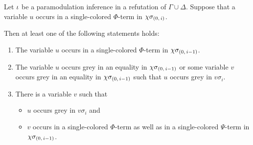 \documentclass[,%
	draft=false,%
	numbers=noendperiod
	12pt,
	a4paper,
	oneside,%
	openany,
]{memoir}
\newcommand{\inv}{\ensuremath{\chi}}
\begin{document}
\begin{lemma}
	\label{lemma:var_in_sc_term_paramod}
	Let $\iota$ be a paramodulation inference in a refutation of $\Gamma\cup\Delta$.
	Suppose that a variable $u$ occurs in a single-colored $\Phi$-term in $\inv\sigmazi$.

	Then at least one of the following statements holds:
	\begin{enumerate}

		\item
			\label{17_5}
			The variable $u$ occurs in a single-colored $\Phi$-term in $\inv\sigmazmi$.

		\item
			\label{17_6}
			The variable $u$ occurs grey in an equality in $\inv\sigmazmi$
			or 
			some variable $v$ occurs grey in an equality in $\inv\sigmazmi$ such that $u$ occurs grey in $v\sigma_i$.






		\item
			\label{17_2}
			There is a variable $v$ such that 
			{
				\renewcommand{\labelitemi}{\textendash}
				\begin{itemize}
					\item $u$ occurs grey in $v\sigma_i$ and
					\item
						$v$ occurs in a single-colored $\Phi$-term as well as in a single-colored $\Psi$-term in $\inv\sigmazmi$.
				\end{itemize}
			}


	\end{enumerate}

\end{lemma}
\end{document}
